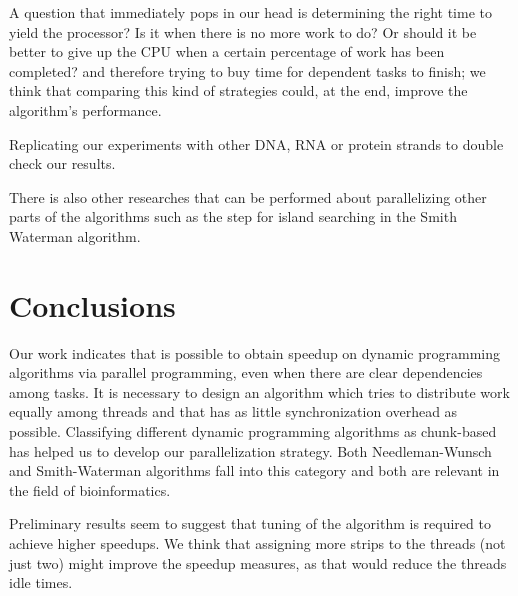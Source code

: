 \documentclass[journal]{IEEEtran}
\begin{document}
A question that immediately pops in our head is determining the right time to yield the processor? Is it when there is no more work to do? Or should it be better to give up the CPU when a certain percentage of work has been completed? and therefore trying to buy time for dependent tasks to finish; we think that comparing this kind of strategies could, at the end, improve the algorithm's performance. 

Replicating our experiments with other DNA, RNA or protein strands to double check our results. 

There is also other researches that can be performed about parallelizing other parts of the algorithms such as the step for island searching in the Smith Waterman algorithm.


\section{Conclusions}

Our work indicates that is possible to obtain speedup on dynamic programming algorithms via parallel programming, even when there are clear dependencies among tasks. It is necessary to design an algorithm which tries to distribute work equally among threads and that has as little synchronization overhead as possible. Classifying different dynamic programming algorithms as chunk-based has helped us to develop our parallelization strategy. Both Needleman-Wunsch and Smith-Waterman algorithms fall into this category and both are relevant in the field of bioinformatics.

Preliminary results seem to suggest that tuning of the algorithm is required to achieve higher speedups. We think that assigning more strips to the threads (not just two) might improve the speedup measures, as that would reduce the threads idle times. 


\ifCLASSOPTIONcaptionsoff
  \newpage
\fi

%
%
\end{document}

